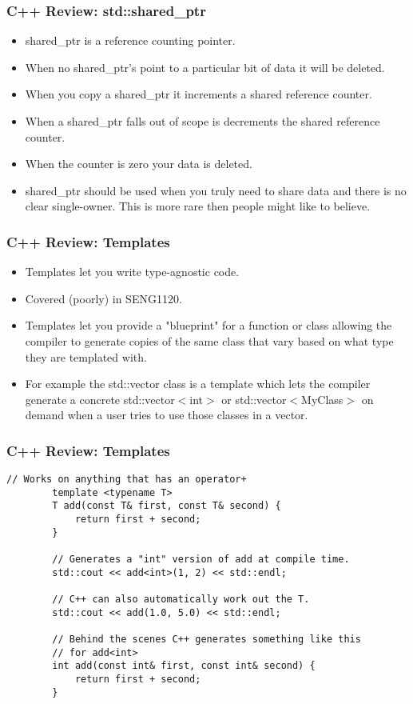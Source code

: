 \documentclass{beamer}
\begin{document}
\begin{frame}[fragile]
	\frametitle{C++ Review: std::shared\_ptr}
	\begin{itemize}
		\item shared\_ptr is a reference counting pointer.
		\item When no shared\_ptr's point to a particular bit of data it will be deleted.
		\item When you copy a shared\_ptr it increments a shared reference counter. 
		\item When a shared\_ptr falls out of scope is decrements the shared reference counter.
		\item When the counter is zero your data is deleted.
		\item shared\_ptr should be used when you truly need to share data and there is no clear single-owner. 
			This is more rare then people might like to believe.
	\end{itemize}
\end{frame}

\begin{frame}
	\frametitle{C++ Review: Templates}
	\begin{itemize}
		\item Templates let you write type-agnostic code.
		\item Covered (poorly) in SENG1120.
		\item Templates let you provide a "blueprint" for a function or class allowing the compiler to generate
			copies of the same class that vary based on what type they are templated with.
		\item For example the std::vector class is a template which lets the compiler generate a concrete
			std::vector$<$int$>$ or std::vector$<$MyClass$>$ on demand when a user tries to use those classes 
			in a vector.
	\end{itemize}
\end{frame}

\begin{frame}[fragile]
	\frametitle{C++ Review: Templates}
	\begin{lstlisting}[language=nuclear]
		// Works on anything that has an operator+
		template <typename T>
		T add(const T& first, const T& second) {
			return first + second;
		}
		
		// Generates a "int" version of add at compile time.
		std::cout << add<int>(1, 2) << std::endl;

		// C++ can also automatically work out the T.
		std::cout << add(1.0, 5.0) << std::endl;

		// Behind the scenes C++ generates something like this
		// for add<int>
		int add(const int& first, const int& second) {
			return first + second;
		}
	\end{lstlisting}
\end{frame}
\end{document}

